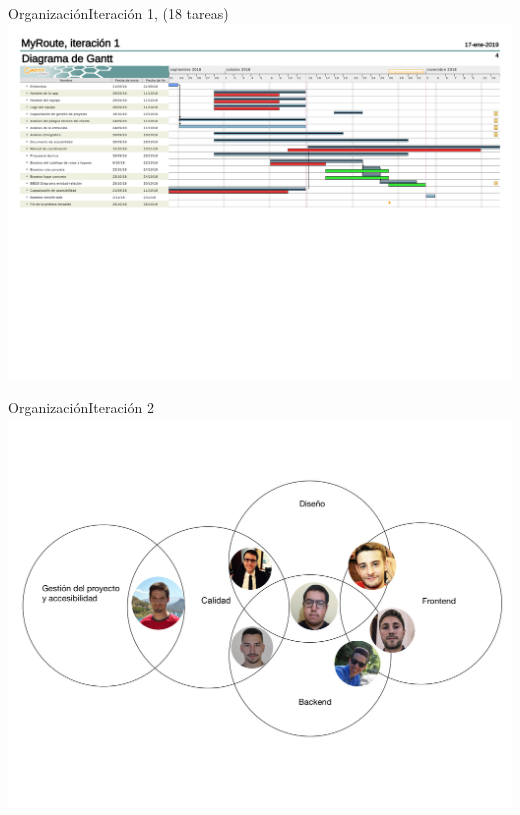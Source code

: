 \documentclass{beamer}
\begin{document}
\begin{frame}{Organizaci\'on}{Iteraci\'on 1, (18 tareas)}
\includegraphics[scale=0.1]{images_latex/gantt_itr1}
\end{frame}



\begin{frame}{Organizaci\'on}{Iteraci\'on 2}
\includegraphics[scale=0.1]{images_latex/org_itr2}
\end{frame}
\end{document}
